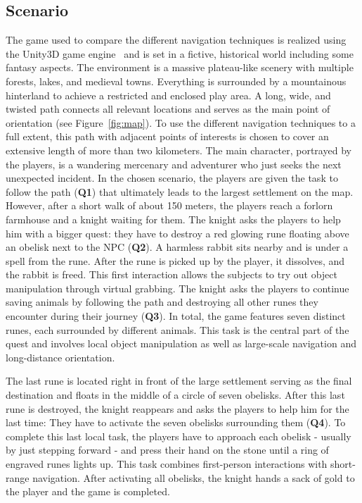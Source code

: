 \documentclass{sigchi}
\begin{document}
\subsection{Scenario}
The game used to compare the different navigation techniques is realized using the Unity3D game engine~\cite{unity} and is set in a fictive, historical world including some fantasy aspects. The environment is a massive plateau-like scenery with multiple forests, lakes, and medieval towns. Everything is surrounded by a mountainous hinterland to achieve a restricted and enclosed play area. A long, wide, and twisted path connects all relevant locations and serves as the main point of orientation (see Figure~\ref{fig:map}). To use the different navigation techniques to a full extent, this path with adjacent points of interests is chosen to cover an extensive length of more than two kilometers. The main character, portrayed by the players, is a wandering mercenary and adventurer who just seeks the next unexpected incident. In the chosen scenario, the players are given the task to follow the path (\textbf{Q1}) that ultimately leads to the largest settlement on the map. However, after a short walk of about 150 meters, the players reach a forlorn farmhouse and a knight waiting for them. The knight asks the players to help him with a bigger quest: they have to destroy a red glowing rune floating above an obelisk next to the NPC (\textbf{Q2}). A harmless rabbit sits nearby and is under a spell from the rune. After the rune is picked up by the player, it dissolves, and the rabbit is freed. This first interaction allows the subjects to try out object manipulation through virtual grabbing. The knight asks the players to continue saving animals by following the path and destroying all other runes they encounter during their journey (\textbf{Q3}). In total, the game features seven distinct runes, each surrounded by different animals. This task is the central part of the quest and involves local object manipulation as well as large-scale navigation and long-distance orientation.\par
The last rune is located right in front of the large settlement serving as the final destination and floats in the middle of a circle of seven obelisks. After this last rune is destroyed, the knight reappears and asks the players to help him for the last time: They have to activate the seven obelisks surrounding them (\textbf{Q4}). To complete this last local task, the players have to approach each obelisk - usually by just stepping forward - and press their hand on the stone until a ring of engraved runes lights up. This task combines first-person interactions with short-range navigation. After activating all obelisks, the knight hands a sack of gold to the player and the game is completed.
\end{document}
